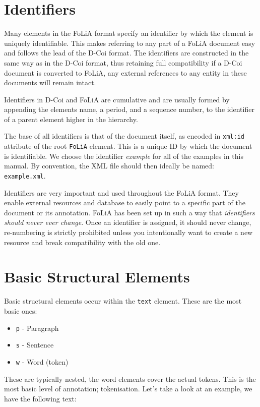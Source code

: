 \documentclass[a4paper,12pt]{report}
\begin{document}
\section{Identifiers}

Many elements in the FoLiA format specify an identifier by which the element is uniquely identifiable. This makes referring to any part of a FoLiA document easy and follows the lead of the D-Coi format. The identifiers are constructed in the same way as in the D-Coi format, thus retaining full compatibility if a D-Coi document is converted to FoLiA, any external references to any entity in these documents will remain intact.

Identifiers in D-Coi and FoLiA are cumulative and are usually formed by appending the elements name, a period, and a sequence number, to the identifier of a parent element higher in the hierarchy.

The base of all identifiers is that of the document itself, as encoded in \texttt{xml:id} attribute of the root \texttt{FoLiA} element. This is a unique ID by which the document is identifiable. We choose the identifier \emph{example} for all of the examples in this manual. By convention, the XML file should then ideally be named: \texttt{example.xml}.

Identifiers are very important and used throughout the FoLiA format. They enable external resources and database to easily point to a specific part of the document or its annotation. FoLiA has been set up in such a way that \emph{identifiers should never ever change}. Once an identifier is assigned, it should never change, re-numbering is strictly prohibited unless you intentionally want to create a new resource and break compatibility with the old one.


\section{Basic Structural Elements}

Basic structural elements occur within the \texttt{text} element. These are the most basic ones:

\begin{itemize}
\item \texttt{p} - Paragraph
\item \texttt{s} - Sentence
\item \texttt{w} - Word (token)
\end{itemize}

These are typically nested, the word elements cover the actual tokens. This is the most basic level of annotation; tokenisation. Let's take a look at an example, we have the following text:
\end{document}
